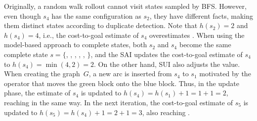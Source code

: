 Originally, a random walk rollout cannot visit states sampled by BFS. However, even though $s_4$ has the same configuration as $s_2$, they have different facts, making them distinct states according to duplicate detection. Note that $h(s_2)=2$ and $h(s_4)=4$, i.e., the cost-to-goal estimate of $s_4$ overestimates \hstar. When using the model-based approach to complete states, both $s_2$ and $s_4$ become the same complete state $s = \{$\mbox{}, \mbox{}, \mbox{}, \mbox{}, \mbox{}, \mbox{}$\}$, and the SAI updates the cost-to-goal estimate of $s_4$ to $h(s_4)=\min(4,2)=2$. On the other hand, SUI also adjusts the value. When creating the graph~$G$, a new arc is inserted from $s_4$ to $s_1$ motivated by the operator that moves the green block onto the blue block. Thus, in the update phase, the estimate of $s_4$ is updated to $h(s_4)=h(s_1)+1=1+1=2$, reaching \hstar in the same way. In the next iteration, the cost-to-goal estimate of $s_5$ is updated to $h(s_5)=h(s_4)+1=2+1=3$, also reaching \hstar.
